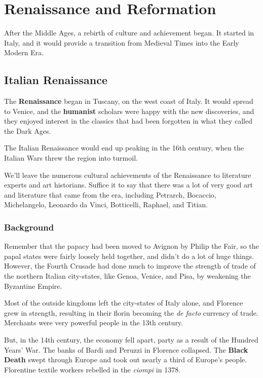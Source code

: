 \chapter{Renaissance and Reformation}

After the Middle Ages, a rebirth of culture and achievement began.
It started in Italy, and it would provide a transition from Medieval Times into the Early Modern Era.

\section{Italian Renaissance}

The \textbf{Renaissance} began in Tuscany, on the west coast of Italy.
It would spread to Venice, and the \textbf{humanist} scholars were happy with the new discoveries,
and they enjoyed interest in the classics that had been forgotten in what they called the Dark Ages.

The Italian Renaissance would end up peaking in the 16th century, when the Italian Wars threw the region into turmoil.

We'll leave the numerous cultural achievements of the Renaissance to literature experts and art historians.
Suffice it to say that there was a lot of very good art and literature that came from the era,
including Petrarch, Bocaccio, Michelangelo, Leonardo da Vinci, Botticelli, Raphael, and Titian.

\subsection*{Background}

Remember that the papacy had been moved to Avignon by Philip the Fair,
so the papal states were fairly loosely held together, and didn't do a lot of huge things.
However, the Fourth Crusade had done much to improve the strength of trade of the northern Italian city-states,
like Genoa, Venice, and Pisa, by weakening the Byzantine Empire.

Most of the outside kingdoms left the city-states of Italy alone,
and Florence grew in strength, resulting in their florin becoming the \textit{de facto} currency of trade.
Merchants were very powerful people in the 13th century.

But, in the 14th century, the economy fell apart, party as a result of the Hundred Years' War.
The banks of Bardi and Peruzzi in Florence collapsed.
The \textbf{Black Death} swept through Europe and took out nearly a third of Europe's people.
Florentine textile workers rebelled in the \textit{ciompi} in 1378.

